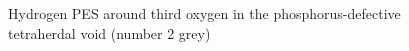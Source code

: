\begin{figure}[h]
\begin{minipage}[h]{0.5\linewidth}
\end{minipage}
\hfill
\begin{minipage}[h]{0.5\linewidth}
\end{minipage}
\caption{Hydrogen PES around third oxygen in the phosphorus-defective tetraherdal void (number 2 grey)}
\label{HinO1,2and3}
\end{figure}

